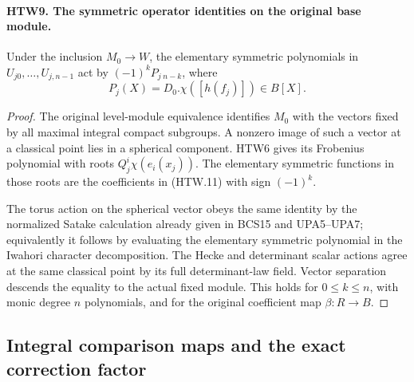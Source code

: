\paragraph{HTW9. The symmetric operator identities on the original base module.}
\label{claim:HTW9}
Under the inclusion \(M_0\to W\), the elementary symmetric
polynomials in \(U_{j0},\ldots,U_{j,n-1}\) act by
\((-1)^kP_j{}_{\,n-k}\), where
\[
 P_j(X)=D_0.\chi([h(f_j)])\in B[X].
 \tag{HTW.11}
\]
\begin{proof}
The original level-module equivalence identifies \(M_0\)
with the vectors fixed by all maximal integral compact
subgroups.  A nonzero image of such a vector at a
classical point lies in a spherical component.
HTW6 gives its Frobenius polynomial with roots
\(Q_j^i\chi(e_i(x_j))\).  The elementary symmetric
functions in those roots are the coefficients in
(HTW.11) with sign \((-1)^k\).

The torus action on the spherical vector obeys the same
identity by the normalized Satake calculation already
given in BCS15 and UPA5--UPA7; equivalently it follows
by evaluating the elementary symmetric polynomial in
the Iwahori character decomposition.  The Hecke and
determinant scalar actions agree at the same classical
point by its full determinant-law field.  Vector
separation descends the equality to the actual fixed
module.  This holds for \(0\le k\le n\), with monic
degree \(n\) polynomials, and for the original
coefficient map \(\beta:R\to B\).
\end{proof}

\subsection{Integral comparison maps and the exact correction factor}


